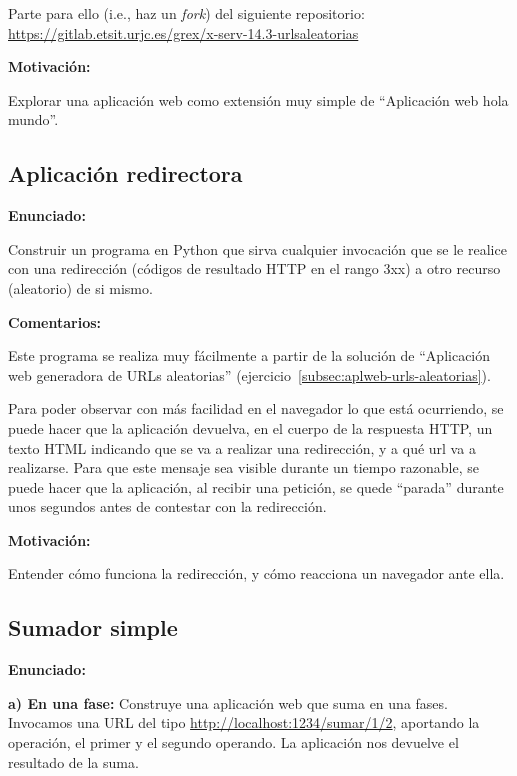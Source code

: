 Parte para ello (i.e., haz un \emph{fork}) del siguiente repositorio: \url{https://gitlab.etsit.urjc.es/grex/x-serv-14.3-urlsaleatorias}

\textbf{Motivación:}

Explorar una aplicación web como extensión muy simple de ``Aplicación web hola mundo''.

\subsection{Aplicación redirectora}
\label{subsec:aplweb-redirectora}

\textbf{Enunciado:}

Construir un programa en Python que sirva cualquier invocación que se le realice con una redirección (códigos de resultado HTTP en el rango 3xx) a otro recurso (aleatorio) de si mismo. 

\textbf{Comentarios:}

Este programa se realiza muy fácilmente a partir de la solución de ``Aplicación web generadora de URLs aleatorias'' (ejercicio~\ref{subsec:aplweb-urls-aleatorias}).

Para poder observar con más facilidad en el navegador lo que está ocurriendo, se puede hacer que la aplicación devuelva, en el cuerpo de la respuesta HTTP, un texto HTML indicando que se va a realizar una redirección, y a qué url va a realizarse. Para que este mensaje sea visible durante un tiempo razonable, se puede hacer que la aplicación, al recibir una petición, se quede ``parada'' durante unos segundos antes de contestar con la redirección.

\textbf{Motivación:}

Entender cómo funciona la redirección, y cómo reacciona un navegador ante ella.

\subsection{Sumador simple}
\label{subsec:sumador-simple}

\textbf{Enunciado:}

{\bf a) En una fase:} Construye una aplicación web que suma en una fases. Invocamos una URL del tipo \url{http://localhost:1234/sumar/1/2}, aportando la operación, el primer y el segundo operando. La aplicación nos devuelve el resultado de la suma.

